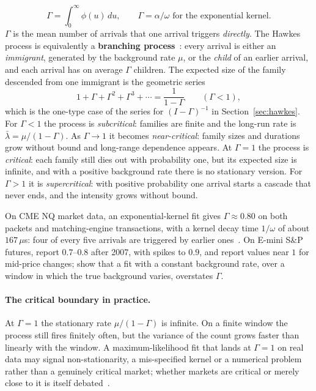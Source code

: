\[
  \Gamma = \int_0^\infty \phi(u)\, du, \qquad \Gamma = \alpha/\omega \text{ for the exponential kernel}.
\]
$\Gamma$ is the mean number of arrivals that one arrival triggers \emph{directly}. The Hawkes process
is equivalently a \textbf{branching process}~\citep{hawkesoakes1974}: every arrival is either an
\emph{immigrant}, generated by the background rate $\mu$, or the \emph{child} of an earlier arrival,
and each arrival has on average $\Gamma$ children. The expected size of the family descended from one
immigrant is the geometric series
\[
  1 + \Gamma + \Gamma^2 + \Gamma^3 + \cdots = \frac{1}{1 - \Gamma} \qquad (\Gamma < 1),
\]
which is the one-type case of the series for $(I - \Gamma)^{-1}$ in Section~\ref{sec:hawkes}. For
$\Gamma < 1$ the process is \emph{subcritical}: families are finite and the long-run rate is
$\bar\lambda = \mu / (1 - \Gamma)$. As $\Gamma \to 1$ it becomes \emph{near-critical}: family sizes
and durations grow without bound and long-range dependence appears. At $\Gamma = 1$ the process is
\emph{critical}: each family still dies out with probability one, but its expected size is infinite,
and with a positive background rate there is no stationary version. For $\Gamma > 1$ it is
\emph{supercritical}: with positive probability one arrival starts a cascade that never ends, and the
intensity grows without bound.

On CME NQ market data, an exponential-kernel fit gives $\Gamma \approx 0.80$ on both packets and
matching-engine transactions, with a kernel decay time $1/\omega$ of about $167\,\mu$s: four of every
five arrivals are triggered by earlier ones~\citep{maciejewski2026packets}.
On E-mini S\&P futures, \citet{filimonovsornette2012} report $0.7$--$0.8$ after 2007, with spikes
to $0.9$, and \citet{hardimanbercotbouchaud2013} report values near $1$ for mid-price changes; \citet{filimonovsornette2015} show that a fit with a
constant background rate, over a window in which the true background varies, overstates $\Gamma$.

\paragraph{The critical boundary in practice.} At $\Gamma = 1$ the stationary rate
$\mu/(1-\Gamma)$ is infinite. On a finite window the process still fires finitely often, but the
variance of the count grows faster than linearly with the window. A maximum-likelihood fit that
lands at $\Gamma = 1$ on real data may signal non-stationarity, a mis-specified kernel or a numerical
problem rather than a genuinely critical market; whether markets are critical or merely close to it is
itself debated~\citep{hardimanbercotbouchaud2013,filimonovsornette2015}.

